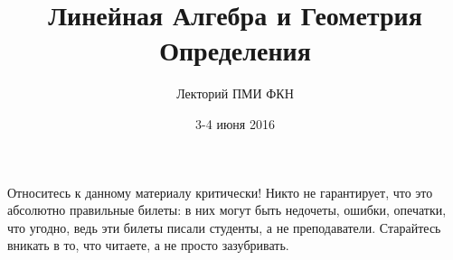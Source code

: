 

\title{Линейная Алгебра и Геометрия\\Определения}
\author{Лекторий ПМИ ФКН}
\date{3-4 июня 2016}


\maketitle

\begin{center}
\huge{Относитесь к данному материалу критически! Никто не гарантирует, что это абсолютно правильные билеты: в них могут быть недочеты, ошибки, опечатки, что угодно, ведь эти билеты писали студенты, а не преподаватели. Старайтесь вникать в то, что читаете, а не просто зазубривать.}
\end{center}

